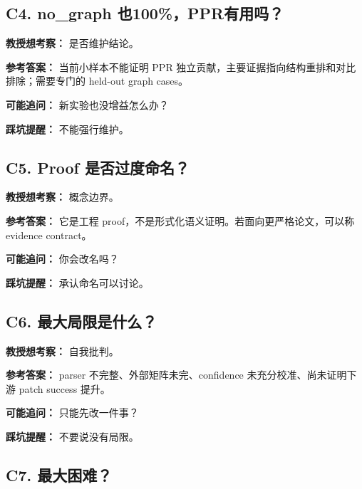 \documentclass[UTF8,12pt,openany]{ctexbook}
\begin{document}
\subsection{C4. no\_graph 也100\%，PPR有用吗？}

\textbf{教授想考察：} 是否维护结论。\par

\textbf{参考答案：} 当前小样本不能证明 PPR 独立贡献，主要证据指向结构重排和对比排除；需要专门的 held-out graph cases。\par

\textbf{可能追问：} 新实验也没增益怎么办？\par

\textbf{踩坑提醒：} 不能强行维护。\par

\subsection{C5. Proof 是否过度命名？}

\textbf{教授想考察：} 概念边界。\par

\textbf{参考答案：} 它是工程 proof，不是形式化语义证明。若面向更严格论文，可以称 evidence contract。\par

\textbf{可能追问：} 你会改名吗？\par

\textbf{踩坑提醒：} 承认命名可以讨论。\par

\subsection{C6. 最大局限是什么？}

\textbf{教授想考察：} 自我批判。\par

\textbf{参考答案：} parser 不完整、外部矩阵未完、confidence 未充分校准、尚未证明下游 patch success 提升。\par

\textbf{可能追问：} 只能先改一件事？\par

\textbf{踩坑提醒：} 不要说没有局限。\par

\subsection{C7. 最大困难？}
\end{document}
